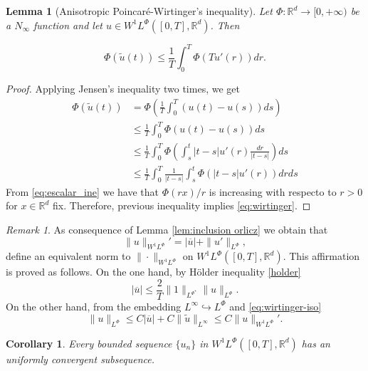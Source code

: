 \documentclass[twoside]{article}
\newtheorem{cor}[thm]{Corollary}
\newtheorem{lem}[thm]{Lemma}
\theoremstyle{remark}
\newtheorem{comentario}{Remark}
\newcommand{\orlnor}{\|_{L^{\Phi}}}
\newcommand{\lphi}{L^{\Phi}}
\newcommand{\wphi}{W^{1}\lphi}
\newcommand{\sobnor}{\|_{W^{1}\lphi}}
\newcommand{\rr}{\mathbb{R}}
\renewcommand{\leq}{\leqslant}
\begin{document}
\begin{lem}[Anisotropic Poincar\'e-Wirtinger's inequality]\label{lem:inclusion orliczII} Let $\Phi:\rr^d\to [0,+\infty)$ be a $N_{\infty}$
function and let $u\in\wphi\left([0,T],\rr^d\right)$. Then

\begin{equation}\label{eq:wirtinger}
  \Phi\left(\tilde{u}(t)\right)\leq\frac{1}{T} \int_0^T \Phi\left(Tu'(r)\right)dr.\tag{A.P-W.I}
\end{equation}

\end{lem}

\begin{proof}  Applying Jensen's inequality two times, we get
\begin{equation*}
\begin{split}
\Phi(\tilde{u}(t))&=\Phi\left(\frac{1}{T}\int_0^T \left(u(t)-u(s)\right) ds\right)\\
&\leq\frac{1}{T}\int_0^T \Phi(u(t)-u(s))ds\\
&\leq \frac{1}{T}\int_0^T \Phi\left(\int_s^t |t-s| u'(r)\frac{dr}{|t-s|}\right)ds\\
&\leq 
\frac{1}{T}\int_0^T \frac{1}{|t-s|} \int_s^t\Phi\left(|t-s| u'(r)\right)drds
\end{split}
\end{equation*}
From \eqref{eq:escalar_ine} we have that $\Phi(rx)/r$ is increasing with respecto to $r>0$ for $x\in\rr^d$ fix. Therefore, previous inequality  implies \eqref{eq:wirtinger}.
\end{proof}


\begin{comentario}\label{com:equiv-norm} As consequence of Lemma \ref{lem:inclusion orlicz} we obtain that 
  \[\|u\sobnor'=|\overline{u}|+\|u'\orlnor,\]
  define an equivalent norm to $\|\cdot\sobnor$ on $\wphi([0,T],\rr^d)$. This affirmation is proved as follows.  On the one hand, by H\"older inequality \eqref{holder}
  \[|\overline{u}|\leq \frac{2}{T}\|1\|_{L^{\Phi^{\star}}}\|u\orlnor .\]
  On the other hand, from the embedding $L^{\infty}\hookrightarrow \lphi$ and \eqref{eq:wirtinger-iso}
  \[\|u\orlnor\leq C|\overline{u}|+C\|\tilde{u}\|_{L^{\infty}}\leq C\|u\sobnor'.\]
  
  
\end{comentario}
 \begin{cor}\label{cor:unif_conv} Every bounded sequence $\{u_n\}$ in  $\wphi([0,T],\rr^d)$  has an uniformly convergent subsequence. 
\end{cor}
\end{document}
